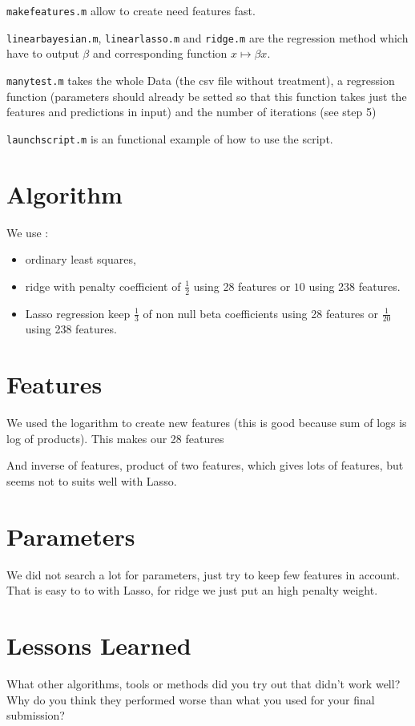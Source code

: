 \documentclass[a4paper, 11pt]{article}
\begin{document}
\verb-makefeatures.m- allow to create need features fast.

\verb-linearbayesian.m-, \verb-linearlasso.m- and \verb-ridge.m- are the regression method which have to output $\beta$ and corresponding function $x\mapsto \beta x$.

\verb-manytest.m- takes the whole Data (the csv file without treatment), a regression function (parameters should already be setted so that this function takes just the features and predictions in input) and the number of iterations (see step 5)

\verb-launchscript.m- is an functional example of how to use the script.

\section{Algorithm}
We use : 
\begin{itemize}
\item ordinary least squares, 
\item ridge with penalty coefficient of $\frac{1}{2}$ using 28 features or $10$ using 238 features.
\item Lasso regression keep $\frac{1}{3}$ of non null beta coefficients using 28 features or $\frac{1}{20}$ using 238 features.
\end{itemize}

\section{Features}
We used the logarithm to create new features (this is good because sum of logs is log of products). This makes our 28 features

And inverse of features, product of two features, which gives lots of features, but seems not to suits well with Lasso.

\section{Parameters}
We did not search a lot for parameters, just try to keep few features in account. That is easy to to with Lasso, for ridge we just put an high penalty weight.

\section{Lessons Learned} What other algorithms, tools or methods did you try out that didn't work well?
Why do you think they performed worse than what you used for your final submission?
\end{document}

